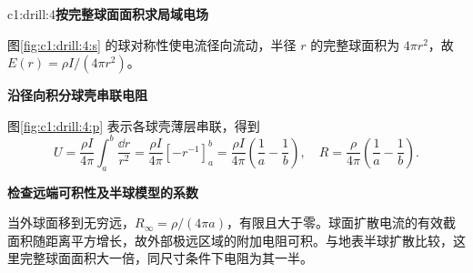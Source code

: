 \begin{drillsolution}{c1:drill:4}\textbf{按完整球面面积求局域电场}\par\nobreak
图\ref{fig:c1:drill:4:s} 的球对称性使电流径向流动，半径 $r$ 的完整球面积为 $4\pi r^2$，故 $E(r)=\rho I/(4\pi r^2)$。



\par\medskip{}\noindent\textbf{沿径向积分球壳串联电阻}\par\nobreak
图\ref{fig:c1:drill:4:p} 表示各球壳薄层串联，得到
\[
 U=\frac{\rho I}{4\pi}\int_a^b\frac{\dd r}{r^2}
 =\frac{\rho I}{4\pi}[-r^{-1}]_a^b
=\frac{\rho I}{4\pi}\left(\frac1a-\frac1b\right),\quad
 R=\frac{\rho}{4\pi}\left(\frac1a-\frac1b\right).
\]


\par\medskip{}\noindent\textbf{检查远端可积性及半球模型的系数}\par\nobreak
当外球面移到无穷远，$R_\infty=\rho/(4\pi a)$，有限且大于零。球面扩散电流的有效截面积随距离平方增长，故外部极远区域的附加电阻可积。与地表半球扩散比较，这里完整球面面积大一倍，同尺寸条件下电阻为其一半。\end{drillsolution}
